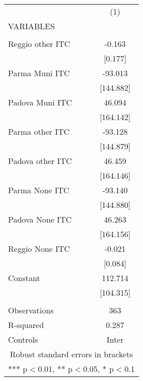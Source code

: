 \begin{tabular}{lc} \hline
 & (1) \\
VARIABLES &  \\ \hline
 &  \\
Reggio other ITC & -0.163 \\
 & [0.177] \\
Parma Muni ITC & -93.013 \\
 & [144.882] \\
Padova Muni ITC & 46.094 \\
 & [164.142] \\
Parma other ITC & -93.128 \\
 & [144.879] \\
Padova other ITC & 46.459 \\
 & [164.146] \\
Parma None ITC & -93.140 \\
 & [144.880] \\
Padova None ITC & 46.263 \\
 & [164.156] \\
Reggio None ITC & -0.021 \\
 & [0.084] \\
Constant & 112.714 \\
 & [104.315] \\
 &  \\
Observations & 363 \\
R-squared & 0.287 \\
 Controls & Inter \\ \hline
\multicolumn{2}{c}{ Robust standard errors in brackets} \\
\multicolumn{2}{c}{ *** p$<$0.01, ** p$<$0.05, * p$<$0.1} \\
\end{tabular}

